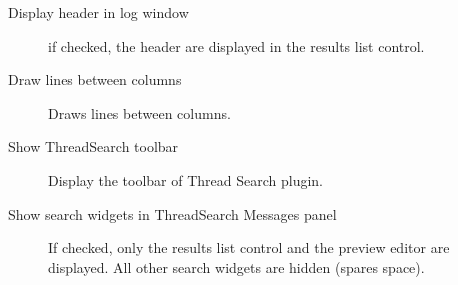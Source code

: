 \begin{description}
\item[Display header in log window] if checked, the header are displayed in the results list control.
\item[Draw lines between columns] Draws lines between columns.
\item[Show ThreadSearch toolbar] Display the toolbar of Thread Search plugin.
\item[Show search widgets in ThreadSearch Messages panel] If checked, only the results list control and the preview editor are displayed. All other search widgets are hidden (spares space).
\end{description}
